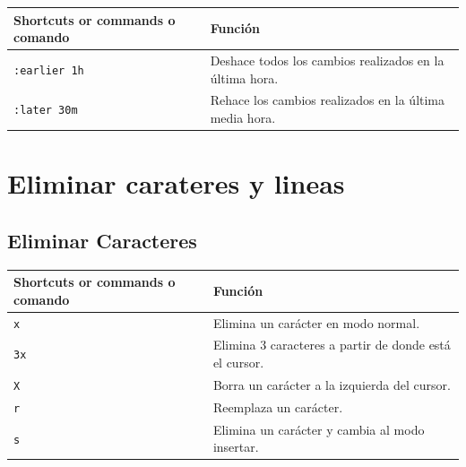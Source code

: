 \documentclass[
  doc,
  floatsintext,
  longtable,
  a4paper,
  nolmodern,
  notxfonts,
  notimes,
  12pt,
  colorlinks=true,linkcolor=blue,citecolor=blue,urlcolor=blue]{apa7}
\newcounter{none} %
\begin{document}
{\def\LTcaptype{none} %
\begin{longtable}[]{@{}
  >{\raggedright\arraybackslash}p{}
  >{\raggedright\arraybackslash}p{}@{}}
\toprule\noalign{}
\begin{minipage}[b]{\linewidth}\raggedright
Shortcuts or commands o comando
\end{minipage} & \begin{minipage}[b]{\linewidth}\raggedright
Función
\end{minipage} \\
\midrule\noalign{}
\endhead
\bottomrule\noalign{}
\endlastfoot
\texttt{:earlier\ 1h} & Deshace todos los cambios realizados en la
última hora. \\
\texttt{:later\ 30m} & Rehace los cambios realizados en la última media
hora. \\
\end{longtable}
}

\section{Eliminar carateres y lineas}\label{eliminar-carateres-y-lineas}

\subsection{Eliminar Caracteres}\label{eliminar-caracteres}

{\def\LTcaptype{none} %
\begin{longtable}[]{@{}
  >{\raggedright\arraybackslash}p{}
  >{\raggedright\arraybackslash}p{}@{}}
\toprule\noalign{}
\begin{minipage}[b]{\linewidth}\raggedright
Shortcuts or commands o comando
\end{minipage} & \begin{minipage}[b]{\linewidth}\raggedright
Función
\end{minipage} \\
\midrule\noalign{}
\endhead
\bottomrule\noalign{}
\endlastfoot
\texttt{x} & Elimina un carácter en modo normal. \\
\texttt{3x} & Elimina 3 caracteres a partir de donde está el cursor. \\
\texttt{X} & Borra un carácter a la izquierda del cursor. \\
\texttt{r} & Reemplaza un carácter. \\
\texttt{s} & Elimina un carácter y cambia al modo insertar. \\
\end{longtable}
}
\end{document}
